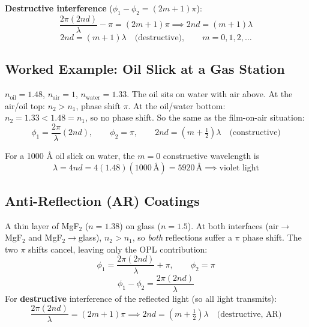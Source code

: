 \documentclass[11pt]{report}
\begin{document}
\textbf{Destructive interference} ($\phi_1 - \phi_2 = (2m+1)\pi$):
\begin{equation}
\frac{2\pi(2nd)}{\lambda} - \pi = (2m+1)\pi \implies 2nd = (m+1)\lambda
\end{equation}
\begin{equation}
\boxed{2nd = (m+1)\lambda \quad \text{(destructive)}, \qquad m = 0, 1, 2, \ldots}
\end{equation}

\subsection*{Worked Example: Oil Slick at a Gas Station}

$n_{\text{oil}} = 1.48$, $n_{\text{air}} = 1$, $n_{\text{water}} = 1.33$. The oil sits on water with air above. At the air/oil top: $n_2 > n_1$, phase shift $\pi$. At the oil/water bottom: $n_2 = 1.33 < 1.48 = n_1$, so no phase shift. So the same as the film-on-air situation:
\begin{equation}
\phi_1 = \frac{2\pi}{\lambda}(2nd), \qquad \phi_2 = \pi, \qquad 2nd = (m + \tfrac{1}{2})\lambda \quad \text{(constructive)}
\end{equation}

For a 1000 \AA{} oil slick on water, the $m=0$ constructive wavelength is
\begin{equation}
\lambda = 4nd = 4(1.48)(1000\,\text{\AA}) = 5920\,\text{\AA} \implies \text{violet light}
\end{equation}

\subsection*{Anti-Reflection (AR) Coatings}

A thin layer of MgF$_2$ ($n = 1.38$) on glass ($n = 1.5$). At both interfaces (air$\to$MgF$_2$ and MgF$_2$$\to$glass), $n_2 > n_1$, so \emph{both} reflections suffer a $\pi$ phase shift. The two $\pi$ shifts cancel, leaving only the OPL contribution:
\begin{equation}
\phi_1 = \frac{2\pi(2nd)}{\lambda} + \pi, \qquad \phi_2 = \pi
\end{equation}
\begin{equation}
\phi_1 - \phi_2 = \frac{2\pi(2nd)}{\lambda}
\end{equation}
For \textbf{destructive} interference of the reflected light (so all light transmits):
\begin{equation}
\frac{2\pi(2nd)}{\lambda} = (2m+1)\pi \implies \boxed{2nd = (m + \tfrac{1}{2})\lambda \quad \text{(destructive, AR)}}
\end{equation}
\end{document}
